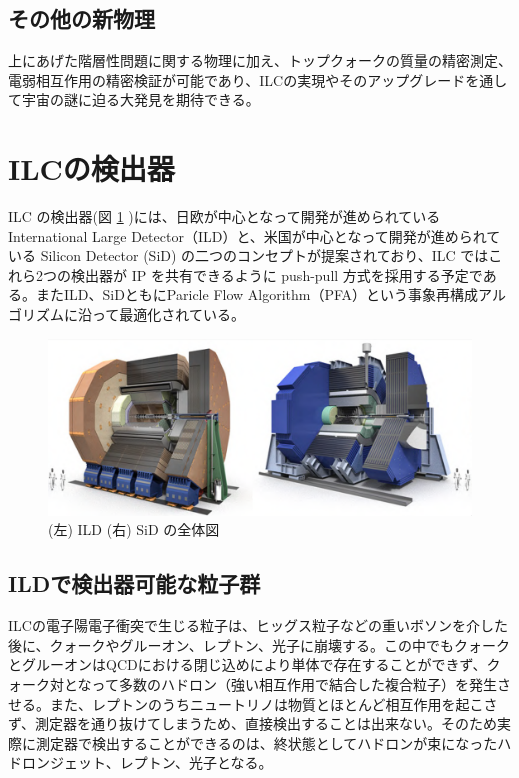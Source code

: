 \subsection{その他の新物理}
上にあげた階層性問題に関する物理に加え、トップクォークの質量の精密測定、電弱相互作用の精密検証が可能であり、ILCの実現やそのアップグレードを通して宇宙の謎に迫る大発見を期待できる。
\section{ILCの検出器}
ILC の検出器(図 \ref{ilcdetector} )には、日欧が中心となって開発が進められている International Large Detector（ILD）と、米国が中心となって開発が進められている Silicon Detector (SiD) の二つのコンセプトが提案されており、ILC ではこれら2つの検出器が IP を共有できるように push-pull 方式を採用する予定である。またILD、SiDともにParicle Flow Algorithm（PFA）という事象再構成アルゴリズムに沿って最適化されている。
\begin{figure}[h]
	\begin{center}
        \includegraphics[keepaspectratio, scale=0.4]
 	{Figure/Introduction/detector.png}
 		\caption[ILDとSiDの全体図]{(左) ILD (右) SiD の全体図~\cite{tdr2}}
 		\label{ilcdetector}
	\end{center}
\end{figure}
\subsection{ILDで検出器可能な粒子群}
ILCの電子陽電子衝突で生じる粒子は、ヒッグス粒子などの重いボソンを介した後に、クォークやグルーオン、レプトン、光子に崩壊する。この中でもクォークとグルーオンはQCDにおける閉じ込めにより単体で存在することができず、クォーク対となって多数のハドロン（強い相互作用で結合した複合粒子）を発生させる。また、レプトンのうちニュートリノは物質とほとんど相互作用を起こさず、測定器を通り抜けてしまうため、直接検出することは出来ない。そのため実際に測定器で検出することができるのは、終状態としてハドロンが束になったハドロンジェット、レプトン、光子となる。
